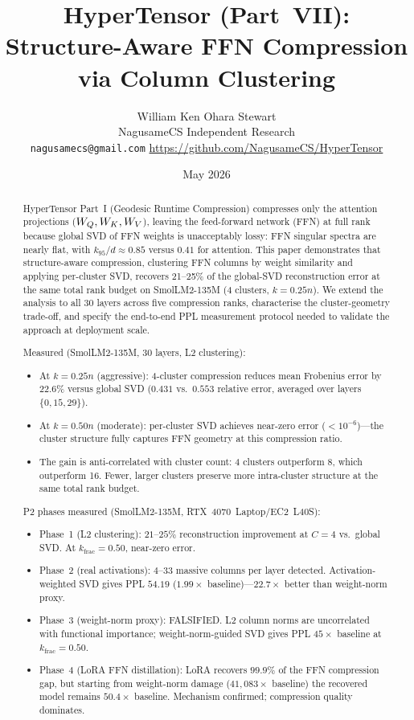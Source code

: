 \documentclass[11pt]{article}
\title{HyperTensor (Part~VII): Structure-Aware FFN Compression\\via Column Clustering}
\author{William Ken Ohara Stewart\\
\small NagusameCS Independent Research\\
\small \texttt{nagusamecs@gmail.com} \quad \url{https://github.com/NagusameCS/HyperTensor}}
\date{May 2026}
\begin{document}
\maketitle
\hypertensorbanner

\begin{abstract}
\noindent
HyperTensor Part~I (Geodesic Runtime Compression) compresses only the attention projections ($W_Q,W_K,
W_V$), leaving the feed-forward network (FFN) at full rank because
global SVD of FFN weights is unacceptably lossy: FFN singular spectra
are nearly flat, with $k_{95}/d\approx0.85$ versus $0.41$ for attention.
This paper demonstrates that structure-aware compression, clustering
FFN columns by weight similarity and applying per-cluster SVD, recovers
21--25\% of the global-SVD reconstruction error at the same
total rank budget on SmolLM2-135M (4 clusters, $k{=}0.25n$).  We extend
the analysis to all 30 layers across five compression ranks, characterise
the cluster-geometry trade-off, and specify the end-to-end PPL measurement
protocol needed to validate the approach at deployment scale.

Measured (SmolLM2-135M, 30 layers, L2 clustering):
\begin{itemize}
\item At $k{=}0.25n$ (aggressive): 4-cluster compression reduces
      mean Frobenius error by 22.6\% versus global SVD
      ($0.431$ vs.\ $0.553$ relative error, averaged over layers
      $\{0,15,29\}$).
\item At $k{=}0.50n$ (moderate): per-cluster SVD achieves near-zero
      error ($<10^{-6}$)---the cluster structure fully captures FFN
      geometry at this compression ratio.
\item The gain is anti-correlated with cluster count: 4 clusters
      outperform 8, which outperform 16.  Fewer, larger clusters
      preserve more intra-cluster structure at the same total rank
      budget.
\end{itemize}

P2 phases measured (SmolLM2-135M, RTX~4070~Laptop/EC2~L40S):
\begin{itemize}
\item Phase~1 (L2 clustering): $21$--$25\%$ reconstruction improvement at
      $C{=}4$ vs.\ global SVD.  At $k_\text{frac}{=}0.50$, near-zero error.
\item Phase~2 (real activations): $4$--$33$ massive columns per layer
      detected.  Activation-weighted SVD gives PPL $54.19$ ($1.99{\times}$
      baseline)---$22.7{\times}$ better than weight-norm proxy.
\item Phase~3 (weight-norm proxy): FALSIFIED.  L2 column norms
      are uncorrelated with functional importance; weight-norm-guided SVD
      gives PPL $45{\times}$ baseline at $k_\text{frac}{=}0.50$.
\item Phase~4 (LoRA FFN distillation): LoRA recovers $99.9\%$ of the
      FFN compression gap, but starting from weight-norm damage
      ($41{,}083{\times}$ baseline) the recovered model remains
      $50.4{\times}$ baseline.  Mechanism confirmed; compression
      quality dominates.
\end{itemize}
\end{abstract}
\end{document}
